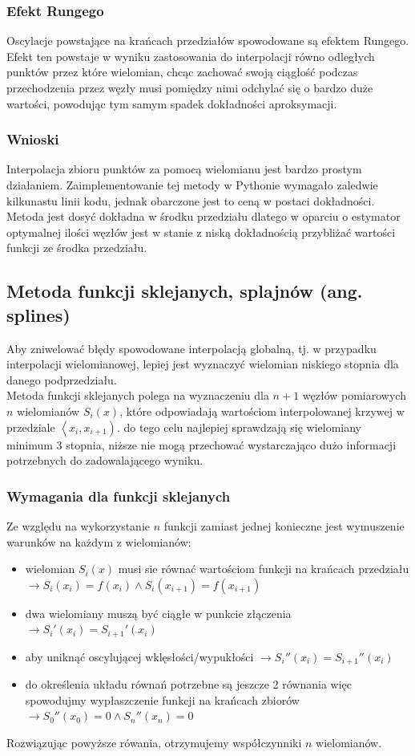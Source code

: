 \documentclass{article} %
\begin{document}
\subsubsection{Efekt Rungego}
Oscylacje powstające na krańcach przedziałów spowodowane są efektem Rungego. Efekt ten powstaje w wyniku zastosowania do interpolacji równo odległych punktów przez które wielomian, chcąc zachować swoją ciągłość podczas przechodzenia przez węzły musi pomiędzy nimi odchylać się o bardzo duże wartości, powodując tym samym spadek dokładności aproksymacji.
\subsubsection{Wnioski}
Interpolacja zbioru punktów za pomocą wielomianu jest bardzo prostym działaniem. Zaimplementowanie tej metody w Pythonie wymagało zaledwie kilkunastu linii kodu, jednak obarczone jest to ceną w postaci dokładności. Metoda jest dosyć dokładna w środku przedziału dlatego w oparciu o estymator optymalnej ilości węzłów jest w stanie z niską dokładnością przybliżać wartości funkcji ze środka przedziału.
\subsection{Metoda funkcji sklejanych, splajnów (ang. splines)}
Aby zniwelować błędy spowodowane interpolacją globalną, tj. w przypadku interpolacji wielomianowej, lepiej jest wyznaczyć wielomian niskiego stopnia dla danego podprzedziału.\\
Metoda funkcji sklejanych polega na wyznaczeniu dla \(n+1\) węzłów pomiarowych \(n\) wielomianów \(S_i(x)\), które odpowiadają wartościom interpolowanej krzywej w przedziale \(\left<x_i, x_{i+1}\right)\). do tego celu najlepiej sprawdzają się wielomiany minimum 3 stopnia, niższe nie mogą przechować wystarczająco dużo informacji potrzebnych do zadowalającego wyniku.
\subsubsection{Wymagania dla funkcji sklejanych}
Ze względu na wykorzystanie \(n\) funkcji zamiast jednej konieczne jest wymuszenie warunków na każdym z wielomianów:
\begin{itemize}
    \item wielomian \(S_i(x)\) musi sie równać wartościom funkcji na krańcach przedziału \(\rightarrow S_i(x_i) = f(x_i) \wedge S_i(x_{i+1}) = f(x_{i+1})\)
    \item dwa wielomiany muszą być ciągłe w punkcie złączenia \(\rightarrow S_i'(x_i) = S_{i+1}'(x_i)\)
    \item aby uniknąć oscylującej wklęsłości/wypukłości \(\rightarrow S_i''(x_i) = S_{i+1}''(x_i)\)
    \item do określenia układu równań potrzebne są jeszcze 2 równania więc spowodujmy wypłaszczenie funkcji na krańcach zbiorów  \(\rightarrow S_0''(x_0) = 0 \wedge S_n''(x_n) = 0\)
\end{itemize}
Rozwiązując powyższe rówania, otrzymujemy współczynniki \(n\) wielomianów.
\end{document}
